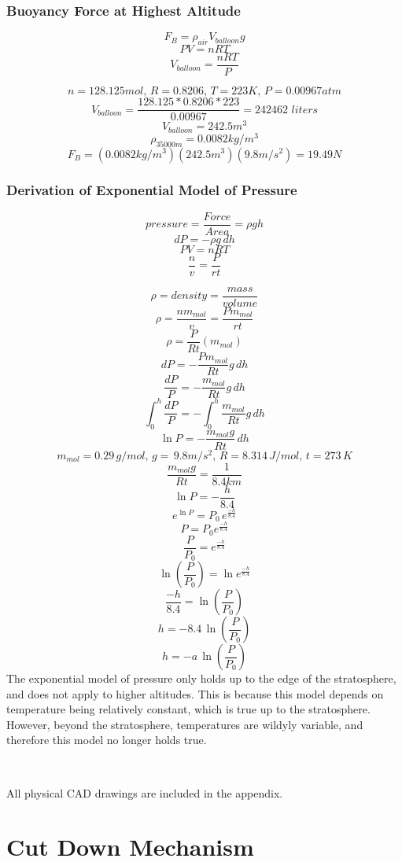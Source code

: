 \documentclass[12pt,]{article}
\begin{document}
\subsubsection{Buoyancy Force at Highest
Altitude}\label{buoyancy-force-at-highest-altitude}

\[F_B = \rho_{air} V_{balloon} g\] \[PV=nRT\]
\[V_{balloon}=\frac{nRT}{P}\]

\[n=128.125mol, \, R = 0.8206, \, T=223K, \, P=0.00967atm\]
\[V_{balloon} = \frac{128.125 * 0.8206 *223}{0.00967} = 242462\,\,liters\]
\[V_{balloon} = 242.5m^3\] \[\rho_{35000m}=0.0082kg/m^3\]
\[\boxed{F_B = (0.0082kg/m^3)(242.5m^3)(9.8m/s^2)=19.49N}\]

\subsubsection{Derivation of Exponential Model of
Pressure}\label{derivation-of-exponential-model-of-pressure}

\[pressure = \frac{Force}{Area} = \rho gh\] \[dP=-\rho g\,dh\]
\[PV=nRT\] \[\frac{n}{v} = \frac{P}{rt}\]

\[\rho = density = \frac{mass}{volume} \]
\[\rho = \frac{nm_{mol}}{v} = \frac{Pm_{mol}}{rt}\]
\[\rho = \frac{P}{Rt}(m_{mol})\] \[dP = -\frac{Pm_{mol}}{Rt}g\,dh\]
\[\frac{dP}{P} =  -\frac{m_{mol}}{Rt}g\,dh\]
\[\int_{0}^{h} \frac{dP}{P} =- \int_{0}^{h} \frac{m_{mol}}{Rt}g\,dh\]
\[\ln{P} = -\frac{m_{mol}g}{Rt}\,dh\]
\[m_{mol}=0.29\,g/mol, \,g=\,9.8m/s^2, \,R=8.314\,J/mol, \,t=273 \, K\]
\[\frac{m_{mol}g}{Rt} = \frac{1}{8.4km}\] \[\ln{P} = -\frac{h}{8.4}\]
\[e^{\ln{P}}=P_0 \,e^{\frac{-h}{8.4}}\]
\[\boxed{P = P_0e^{\frac{-h}{8.4}}}\]
\[\frac{P}{P_0} = e^{\frac{-h}{8.4}}\]
\[\ln{(\frac{P}{P_0})} = \ln{e^{\frac{-h}{8.4}}}\]
\[\frac{-h}{8.4} = \ln{(\frac{P}{P_0})}\]
\[h = -8.4 \, \ln{(\frac{P}{P_0})}\]
\[\boxed{h = -a \, \ln{(\frac{P}{P_0})}}\] The exponential model of
pressure only holds up to the edge of the stratosphere, and does not
apply to higher altitudes. This is because this model depends on
temperature being relatively constant, which is true up to the
stratosphere. However, beyond the stratosphere, temperatures are wildyly
variable, and therefore this model no longer holds true.

~

All physical CAD drawings are included in the appendix.

\section{Cut Down Mechanism}\label{cut-down-mechanism}
\end{document}
